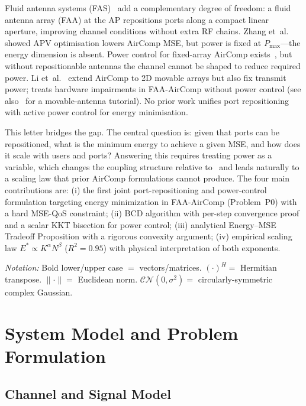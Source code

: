 \documentclass[journal,letterpaper,10pt,twocolumn]{IEEEtran}
\begin{document}
Fluid antenna systems (FAS)~\cite{Wong2021,Wong2022} add a
complementary degree of freedom: a fluid antenna array (FAA) at the AP
repositions ports along a compact linear aperture, improving channel
conditions without extra RF chains. Zhang et~al.~\cite{Zhang2024} showed
APV optimisation lowers AirComp MSE, but power is fixed at
$P_{\max}$---the energy dimension is absent. Power control for
fixed-array AirComp exists~\cite{Cao2020,Liu2020}, but without
repositionable antennas the channel cannot be shaped to reduce required
power. Li et~al.~\cite{Li2025} extend AirComp to 2D movable arrays but
also fix transmit power; \cite{LiHW2024} treats hardware impairments in
FAA-AirComp without power control (see also~\cite{Zhu2025} for a
movable-antenna tutorial). No prior work unifies port
repositioning with active power control for energy minimisation.

This letter bridges the gap. The central question is: given that ports
can be repositioned, what is the minimum energy to achieve a given MSE,
and how does it scale with users and ports? Answering this requires
treating power as a variable, which changes the coupling structure
relative to~\cite{Zhang2024} and leads naturally to a scaling law that
prior AirComp formulations cannot produce. The four main contributions
are: (i) the first joint port-repositioning and power-control
formulation targeting energy minimization in FAA-AirComp
(Problem~P0) with a hard MSE-QoS constraint; (ii) BCD algorithm with
per-step convergence proof and a scalar KKT bisection for power control;
(iii) analytical Energy--MSE Tradeoff Proposition with a rigorous
convexity argument; (iv) empirical scaling law
$E^{*}\!\propto\!K^{\alpha}N^{\beta}$ ($R^{2}\!=\!0.95$) with physical
interpretation of both exponents.

\textit{Notation:} Bold lower/upper case $=$ vectors/matrices.
$(\cdot)^{H}=$ Hermitian transpose. $\|\cdot\|=$ Euclidean norm.
$\mathcal{CN}(0,\sigma^{2})=$ circularly-symmetric complex Gaussian.

\section{System Model and Problem Formulation}

\subsection{Channel and Signal Model}
\end{document}

